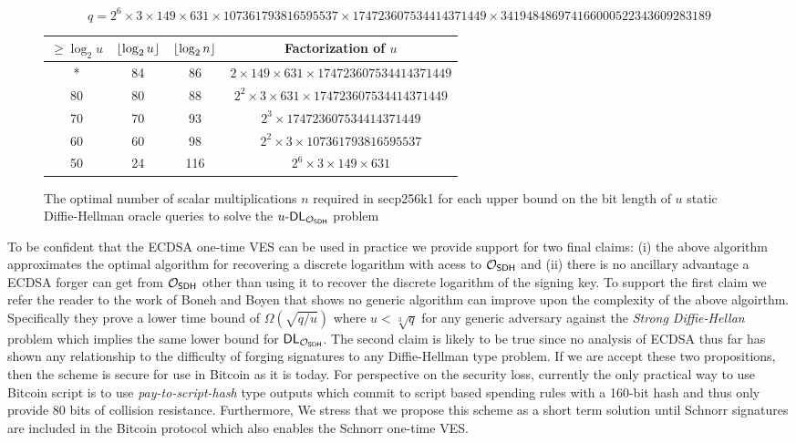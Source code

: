 \begin{figure}[h]
  \centering
  \[ q = 2^6 \times 3 \times 149 \times 631 \times 107361 793816 595537 \times 174 723607 534414 371449 \times 341 948486 974166 000522 343609 283189  \]
 \begin{tabular}{||c c c c||}
 \hline
 $\geq \log_2u $ & $\left\lfloor \log_2u\right\rfloor$ & $\left\lfloor \log_2n\right\rfloor$ & Factorization of $u$ \\ [0.5ex]
 \hline\hline
  * & 84 & 86 & $2 \times 149 \times 631 \times 174723607534414371449$ \\
  \hline
  80 & 80 & 88 & $2^2 \times 3 \times 631 \times 174723607534414371449$ \\
  \hline
  70 & 70 & 93 & $2^3 \times 174723607534414371449$ \\
  \hline
  60 & 60 & 98 & $2^2 \times 3 \times 107361793816595537$ \\
  \hline
  50 & 24 & 116 & $2^6 \times 3 \times 149 \times 631$ \\ [1ex]
  \hline
 \hline
\end{tabular}
\caption{The optimal number of scalar multiplications $n$ required in secp256k1 for each upper bound on the bit length of $u$ static Diffie-Hellman oracle queries to solve the $u\text{-}\textsf{DL}_{\mathcal{O}_{\textsf{SDH}}}$ problem}
\label{fig:sdh_alg_time}
\end{figure}

To be confident that the ECDSA one-time VES can be used in practice we provide support for two final claims: (i) the above algorithm approximates the optimal algorithm for recovering a discrete logarithm with acess to $\mathcal{O}_{\textsf{SDH}}$ and (ii) there is no ancillary advantage a ECDSA forger can get from $\mathcal{O}_{\textsf{SDH}}$ other than using it to recover the discrete logarithm of the signing key.
To support the first claim we refer the reader to the work of Boneh and Boyen \cite{BBSig} that shows no generic algorithm can improve upon the complexity of the above algoirthm.
Specifically they prove a lower time bound of $\Omega(\sqrt{q/u})$  where $u < \sqrt[3]{q}$ for any generic adversary against the \emph{Strong Diffie-Hellan} problem which implies the same lower bound for $\textsf{DL}_{\mathcal{O}_{\textsf{SDH}}}$.
The second claim is likely to be true since no analysis of ECDSA thus far has shown any relationship to the difficulty of forging signatures to any Diffie-Hellman type problem.
If we are accept these two propositions, then the scheme is secure for use in Bitcoin as it is today.
For perspective on the security loss, currently the only practical way to use Bitcoin script is to use \emph{pay-to-script-hash} type outputs which commit to script based spending rules with a 160-bit hash and thus only provide 80 bits of collision resistance.
Furthermore, We stress that we propose this scheme as a short term solution until Schnorr signatures are included in the Bitcoin protocol which also enables the Schnorr one-time VES.
